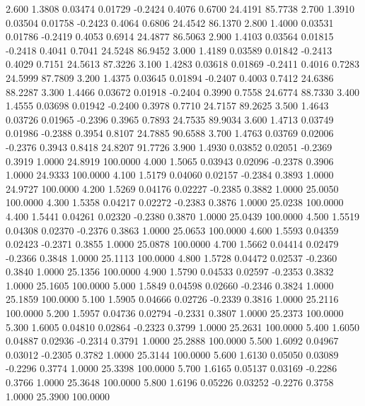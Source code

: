    2.600   1.3808   0.03474   0.01729  -0.2424   0.4076   0.6700  24.4191  85.7738
   2.700   1.3910   0.03504   0.01758  -0.2423   0.4064   0.6806  24.4542  86.1370
   2.800   1.4000   0.03531   0.01786  -0.2419   0.4053   0.6914  24.4877  86.5063
   2.900   1.4103   0.03564   0.01815  -0.2418   0.4041   0.7041  24.5248  86.9452
   3.000   1.4189   0.03589   0.01842  -0.2413   0.4029   0.7151  24.5613  87.3226
   3.100   1.4283   0.03618   0.01869  -0.2411   0.4016   0.7283  24.5999  87.7809
   3.200   1.4375   0.03645   0.01894  -0.2407   0.4003   0.7412  24.6386  88.2287
   3.300   1.4466   0.03672   0.01918  -0.2404   0.3990   0.7558  24.6774  88.7330
   3.400   1.4555   0.03698   0.01942  -0.2400   0.3978   0.7710  24.7157  89.2625
   3.500   1.4643   0.03726   0.01965  -0.2396   0.3965   0.7893  24.7535  89.9034
   3.600   1.4713   0.03749   0.01986  -0.2388   0.3954   0.8107  24.7885  90.6588
   3.700   1.4763   0.03769   0.02006  -0.2376   0.3943   0.8418  24.8207  91.7726
   3.900   1.4930   0.03852   0.02051  -0.2369   0.3919   1.0000  24.8919 100.0000
   4.000   1.5065   0.03943   0.02096  -0.2378   0.3906   1.0000  24.9333 100.0000
   4.100   1.5179   0.04060   0.02157  -0.2384   0.3893   1.0000  24.9727 100.0000
   4.200   1.5269   0.04176   0.02227  -0.2385   0.3882   1.0000  25.0050 100.0000
   4.300   1.5358   0.04217   0.02272  -0.2383   0.3876   1.0000  25.0238 100.0000
   4.400   1.5441   0.04261   0.02320  -0.2380   0.3870   1.0000  25.0439 100.0000
   4.500   1.5519   0.04308   0.02370  -0.2376   0.3863   1.0000  25.0653 100.0000
   4.600   1.5593   0.04359   0.02423  -0.2371   0.3855   1.0000  25.0878 100.0000
   4.700   1.5662   0.04414   0.02479  -0.2366   0.3848   1.0000  25.1113 100.0000
   4.800   1.5728   0.04472   0.02537  -0.2360   0.3840   1.0000  25.1356 100.0000
   4.900   1.5790   0.04533   0.02597  -0.2353   0.3832   1.0000  25.1605 100.0000
   5.000   1.5849   0.04598   0.02660  -0.2346   0.3824   1.0000  25.1859 100.0000
   5.100   1.5905   0.04666   0.02726  -0.2339   0.3816   1.0000  25.2116 100.0000
   5.200   1.5957   0.04736   0.02794  -0.2331   0.3807   1.0000  25.2373 100.0000
   5.300   1.6005   0.04810   0.02864  -0.2323   0.3799   1.0000  25.2631 100.0000
   5.400   1.6050   0.04887   0.02936  -0.2314   0.3791   1.0000  25.2888 100.0000
   5.500   1.6092   0.04967   0.03012  -0.2305   0.3782   1.0000  25.3144 100.0000
   5.600   1.6130   0.05050   0.03089  -0.2296   0.3774   1.0000  25.3398 100.0000
   5.700   1.6165   0.05137   0.03169  -0.2286   0.3766   1.0000  25.3648 100.0000
   5.800   1.6196   0.05226   0.03252  -0.2276   0.3758   1.0000  25.3900 100.0000
